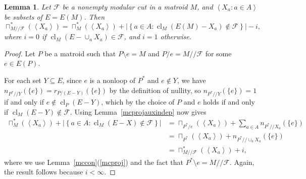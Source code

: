 \documentclass{amsart}
\theoremstyle{plain}
\newtheorem{lemma}[theorem]{Lemma}
\theoremstyle{definition}
\newcommand{\cF}{\mathcal{F}}
\newcommand{\dcon}{/ \!\! /}
\DeclareMathOperator{\cl}{cl}
\newcommand{\del}{\!\setminus\!}
\newcommand{\con}{/}
\newcommand{\abs}[1]{\left| #1 \right|}
\newcommand{\set}[1]{\left\{#1\right\}}
\newcommand{\ab}[1]{\left\langle#1\right\rangle}
\renewcommand{\le}{\leqslant}
\renewcommand{\ge}{\geqslant}
\renewcommand{\ss}{\subseteq}
\newcommand{\setof}[2]{\set{{#1} : {#2}}}
\begin{document}
\begin{lemma}\label{dualmodcutcon}
  Let $\cF$ be a nonempty modular cut in a matroid $M$, and $\ab{X_a : a \in A}$ be subsets of $E = E(M)$. 
  Then 
  \[\sqcap^*_{M \dcon \cF}(\ab{X_a}) = \sqcap_{M}^*(\ab{X_a}) + \abs{\setof{a \in A}{\cl_M(E(M) - X_a) \notin \cF}} - i,\] 
  where $i = 0$ if $\cl_M(E - \cup_a X_a) \in \cF$, and $i = 1$ otherwise. 
\end{lemma}
\begin{proof}
  Let $P$ be a matroid such that $P \del e = M$ and $P \con e = M \dcon \cF$ 
  for some $e \in E(P)$. 

  For each set $Y \ss E$, since $e$ is a nonloop of $P^*$ and $e \notin Y$, 
  we have $n_{P^* \dcon Y}(\{e\}) = r_{P \con (E - Y)}(\{e\})$ by the definition of nullity, 
  so $n_{P^* \dcon Y}(\{e\}) = 1$ if and only if $e \notin \cl_P(E - Y)$, 
  which by the choice of $P$ and $e$ holds if and only if $\cl_M(E - Y) \notin \cF$. 
  Using Lemma~\ref{mcprojauxindep} now gives 
  \begin{align*}
    \sqcap^*_M(\ab{X_a}) + \abs{\setof{a \in A}{\cl_M(E - X) \notin \cF}} 
      &= \sqcap_{P^* \con e}(\ab{X_a}) + \sum_{a \in A}n_{P^* \dcon X_a}(\{e\}) \\ 
      &= \sqcap_{P^*}(\ab{X_a}) + n_{P^* \dcon \cup_a X_a}(\{e\}) \\ 
      &= \sqcap_{M \dcon \cF}^*(\ab{X_a}) + i,
  \end{align*}
  where we use  Lemma~\ref{mccon}(\ref{mcproj}) and the fact that $P^* \del e = M \dcon \cF$. 
  Again, the result follows because $i < \infty$. 
\end{proof}


\end{document}
